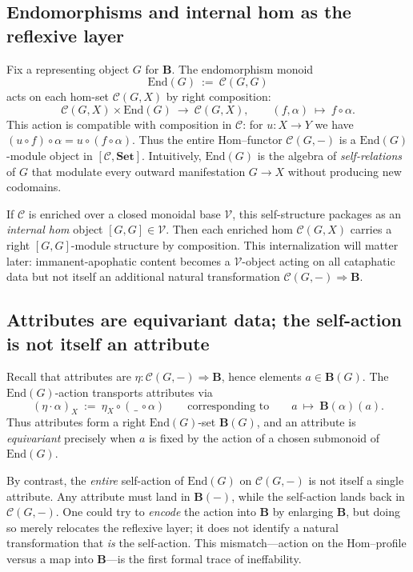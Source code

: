 \documentclass[11pt]{article}
\theoremstyle{upright}
\begin{document}
\subsection{Endomorphisms and internal hom as the reflexive layer}
Fix a representing object \(G\) for \(\mathbf B\). The endomorphism monoid
\[
\mathrm{End}(G)\ :=\ \mathcal C(G,G)
\]
acts on each hom-set \(\mathcal C(G,X)\) by right composition:
\[
\mathcal C(G,X)\times \mathrm{End}(G)\ \longrightarrow\ \mathcal C(G,X),\qquad (f,\alpha)\ \mapsto\ f\circ \alpha.
\]
This action is compatible with composition in \(\mathcal C\): for \(u:X\to Y\) we have \((u\circ f)\circ \alpha = u\circ (f\circ \alpha)\). Thus the entire Hom–functor \(\mathcal C(G,-)\) is a \(\mathrm{End}(G)\)-module object in \([\mathcal C,\mathbf{Set}]\). Intuitively, \(\mathrm{End}(G)\) is the algebra of \emph{self-relations} of \(G\) that modulate every outward manifestation \(G\to X\) without producing new codomains.

If \(\mathcal C\) is enriched over a closed monoidal base \(\mathcal V\), this self-structure packages as an \emph{internal hom} object \([G,G]\in \mathcal V\). Then each enriched hom \(\mathcal C(G,X)\) carries a right \([G,G]\)-module structure by composition. This internalization will matter later: immanent-apophatic content becomes a \(\mathcal V\)-object acting on all cataphatic data but not itself an additional natural transformation \(\mathcal C(G,-)\Rightarrow \mathbf B\).

\subsection{Attributes are equivariant data; the self-action is not itself an attribute}
Recall that attributes are \(\eta:\mathcal C(G,-)\Rightarrow \mathbf B\), hence elements \(a\in \mathbf B(G)\). The \(\mathrm{End}(G)\)-action transports attributes via
\[
(\eta\cdot \alpha)_X\ :=\ \eta_X\circ(\,\_\,\circ\alpha)\qquad\text{corresponding to}\qquad a\ \mapsto\ \mathbf B(\alpha)(a).
\]
Thus attributes form a right \(\mathrm{End}(G)\)-set \(\mathbf B(G)\), and an attribute is \emph{equivariant} precisely when \(a\) is fixed by the action of a chosen submonoid of \(\mathrm{End}(G)\).

By contrast, the \emph{entire} self-action of \(\mathrm{End}(G)\) on \(\mathcal C(G,-)\) is not itself a single attribute. Any attribute must land in \(\mathbf B(-)\), while the self-action lands back in \(\mathcal C(G,-)\). One could try to \emph{encode} the action into \(\mathbf B\) by enlarging \(\mathbf B\), but doing so merely relocates the reflexive layer; it does not identify a natural transformation that \emph{is} the self-action. This mismatch—action on the Hom–profile versus a map into \(\mathbf B\)—is the first formal trace of ineffability.
\end{document}
